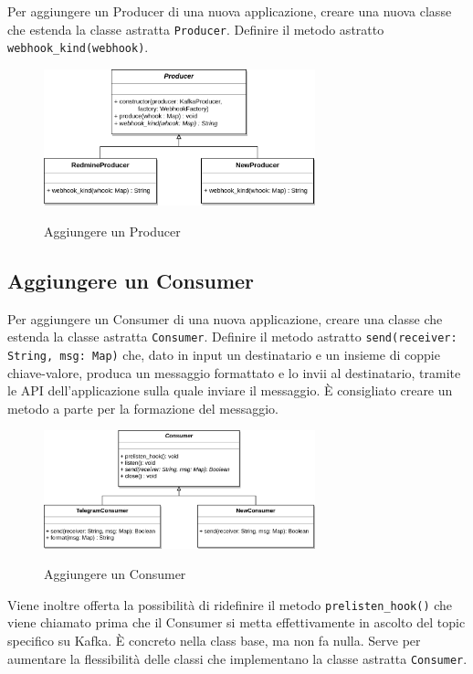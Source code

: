Per aggiungere un Producer di una nuova applicazione, creare una nuova classe che estenda la classe astratta \texttt{Producer}.
Definire il metodo astratto \texttt{webhook\_kind(webhook)}.

\begin{figure}[H]
    \centering
    \includegraphics[width=0.7\textwidth]{img/EstensioneProducer.png}\\
    \caption{Aggiungere un Producer}
\end{figure}


\subsection{Aggiungere un Consumer}

Per aggiungere un Consumer di una nuova applicazione, creare una classe che estenda la classe astratta \texttt{Consumer}.
Definire il metodo astratto \texttt{send(receiver: String, msg: Map)} che, dato in input un destinatario e un insieme di coppie
chiave-valore, produca un messaggio formattato e lo invii al destinatario, tramite le API dell'applicazione sulla quale inviare il messaggio.
È consigliato creare un metodo a parte per la formazione del messaggio.

\begin{figure}[H]
    \centering
    \includegraphics[width=0.7\textwidth]{img/EstensioneConsumer.png}\\
    \caption{Aggiungere un Consumer}
\end{figure}

Viene inoltre offerta la possibilità di ridefinire il metodo \texttt{prelisten\_hook()} che viene chiamato prima che il Consumer si metta effettivamente in ascolto
del topic specifico su Kafka.
È concreto nella class base, ma non fa nulla. Serve per aumentare la flessibilità delle classi che implementano la classe astratta \texttt{Consumer}.
